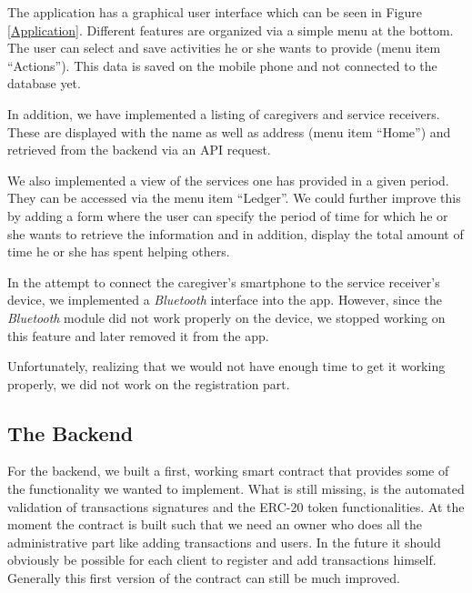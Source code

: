 \documentclass[12pt]{report}
\begin{document}
The application has a graphical user interface which can be seen in Figure \ref{Application}. Different features are organized via a simple menu at the bottom. The user can select and save activities he or she wants to provide (menu item ``Actions''). This data is saved on the mobile phone and not connected to the database yet.

In addition, we have implemented a listing of caregivers and service receivers. These are displayed with the name as well as address (menu item ``Home'') and retrieved from the backend via an API request.

We also implemented a view of the services one has provided in a given period. They can be accessed via the menu item ``Ledger''. We could further improve this by adding a form where the user can specify the period of time for which he or she wants to retrieve the information and in addition, display the total amount of time he or she has spent helping others.

In the attempt to connect the caregiver's smartphone to the service receiver's device, we implemented a \emph{Bluetooth} interface into the app. However, since the \emph{Bluetooth} module did not work properly on the device, we stopped working on this feature and later removed it from the app.

Unfortunately, realizing that we would not have enough time to get it working properly, we did not work on the registration part.



\subsection{The Backend}

For the backend, we built a first, working smart contract that provides some of the functionality we wanted to implement.
What is still missing, is the automated validation of transactions signatures and the ERC-20 token functionalities.
At the moment the contract is built such that we need an owner who does all the administrative part like adding transactions and users.
In the future it should obviously be possible for each client to register and add transactions himself.
Generally this first version of the contract can still be much improved.
\end{document}
